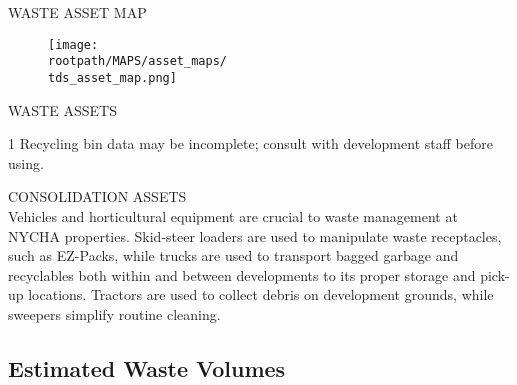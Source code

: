 \pagebreak

\textcolor{ccorange}{WASTE ASSET MAP}
\begin{figure}[H]
\raggedright
\texttt{[image: \\rootpath/MAPS/asset\_maps/\\tds\_asset\_map.png]}
\end{figure}
\pagebreak

\textcolor{ccorange}{WASTE ASSETS}

\begin{table}[H]
\begin{threeparttable}
\small



\begin{tablenotes}
\item [1] Recycling bin data may be incomplete; consult with development staff before using.
\end{tablenotes}
\end{threeparttable}
\end{table}

\textcolor{ccorange}{CONSOLIDATION ASSETS}\\
Vehicles and horticultural equipment are crucial to waste management at NYCHA properties. Skid-steer loaders are used to manipulate waste receptacles, such as EZ-Packs, while trucks are used to transport bagged garbage and recyclables both within and between developments to its proper storage and pick-up locations. Tractors are used to collect debris on development grounds, while sweepers simplify routine cleaning.
\begin{table}[H]

\end{table}
\pagebreak

\textcolor{ccorange}{\section{Estimated Waste Volumes}}


